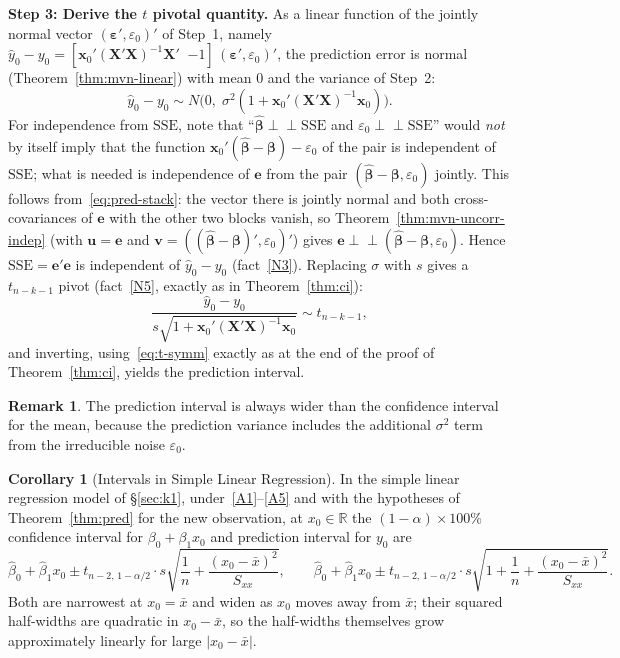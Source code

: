 \documentclass[12pt,a4paper]{article}
\makeatletter
\theoremstyle{definition}
\newtheorem{corollary}[theorem]{Corollary}
\newtheorem{remark}[theorem]{Remark}
\renewenvironment{proof}[1][\proofname]{\par
  \pushQED{\qed}%
  \normalfont \topsep6\p@\@plus6\p@\relax
  \trivlist
  \item[\hskip\labelsep\bfseries #1\@addpunct{.}]\ignorespaces
}{%
  \popQED\endtrivlist\@endpefalse
}
\newcommand{\SSE}{\mathrm{SSE}}
\newcommand{\bX}{\mathbf{X}}
\newcommand{\bx}{\mathbf{x}}
\def\bb{\boldsymbol{\beta}}
\newcommand{\be}{\boldsymbol{\varepsilon}}
\newcommand{\bv}{\mathbf{v}}
\newcommand{\Real}{\mathbb{R}}
\newcommand{\indep}{\perp\!\!\!\perp}
\newcommand{\bu}{\mathbf{u}}
\makeatother
\begin{document}
\begin{proof}
\textbf{Step 3: Derive the $t$ pivotal quantity.} As a linear function of the jointly normal vector $(\be', \varepsilon_0)'$ of Step~1, namely $\hat{y}_0 - y_0 = [\bx_0'(\bX'\bX)^{-1}\bX' \;\; {-1}]\,(\be', \varepsilon_0)'$, the prediction error is normal (Theorem~\ref{thm:mvn-linear}) with mean $0$ and the variance of Step~2:
\[
\hat{y}_0 - y_0 \sim N\!\bigl(0,\; \sigma^2(1 + \bx_0'(\bX'\bX)^{-1}\bx_0)\bigr).
\]
For independence from $\SSE$, note that ``$\hat{\bb} \indep \SSE$ and $\varepsilon_0 \indep \SSE$'' would \emph{not} by itself imply that the function $\bx_0'(\hat{\bb} - \bb) - \varepsilon_0$ of the pair is independent of $\SSE$; what is needed is independence of $\mathbf{e}$ from the pair $(\hat{\bb} - \bb, \varepsilon_0)$ jointly. This follows from~\eqref{eq:pred-stack}: the vector there is jointly normal and both cross-covariances of $\mathbf{e}$ with the other two blocks vanish, so Theorem~\ref{thm:mvn-uncorr-indep} (with $\bu = \mathbf{e}$ and $\bv = ((\hat{\bb} - \bb)', \varepsilon_0)'$) gives $\mathbf{e} \indep (\hat{\bb} - \bb, \varepsilon_0)$. Hence $\SSE = \mathbf{e}'\mathbf{e}$ is independent of $\hat{y}_0 - y_0$ (fact~\ref{N3}). Replacing $\sigma$ with $s$ gives a $t_{n-k-1}$ pivot (fact~\ref{N5}, exactly as in Theorem~\ref{thm:ci}):
\[
\frac{\hat{y}_0 - y_0}{s\sqrt{1 + \bx_0'(\bX'\bX)^{-1}\bx_0}} \sim t_{n-k-1},
\]
and inverting, using~\eqref{eq:t-symm} exactly as at the end of the proof of Theorem~\ref{thm:ci}, yields the prediction interval.
\end{proof}

\begin{remark}\label{rem:pi-wider}
The prediction interval is always wider than the confidence interval for the mean, because the prediction variance includes the additional $\sigma^2$ term from the irreducible noise $\varepsilon_0$.
\end{remark}

\begin{corollary}[Intervals in Simple Linear Regression]\label{cor:pred-slr}
In the simple linear regression model of \S\ref{sec:k1}, under~\ref{A1}--\ref{A5} and with the hypotheses of Theorem~\ref{thm:pred} for the new observation, at $x_0 \in \Real$ the $(1-\alpha) \times 100\%$ confidence interval for $\beta_0 + \beta_1x_0$ and prediction interval for $y_0$ are
\[
\hat\beta_0 + \hat\beta_1x_0 \pm t_{n-2,\,1-\alpha/2}\cdot s\sqrt{\frac{1}{n} + \frac{(x_0 - \bar x)^2}{S_{xx}}}, \qquad \hat\beta_0 + \hat\beta_1x_0 \pm t_{n-2,\,1-\alpha/2}\cdot s\sqrt{1 + \frac{1}{n} + \frac{(x_0 - \bar x)^2}{S_{xx}}}.
\]
Both are narrowest at $x_0 = \bar x$ and widen as $x_0$ moves away from $\bar x$; their squared half-widths are quadratic in $x_0 - \bar x$, so the half-widths themselves grow approximately linearly for large $|x_0 - \bar x|$.
\end{corollary}
\end{document}
